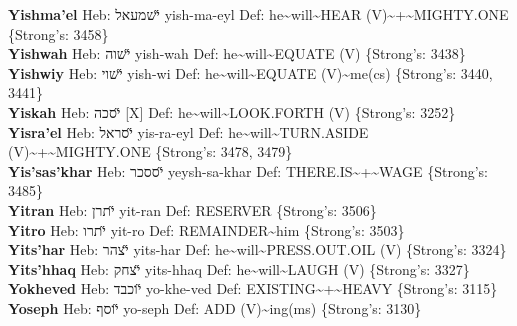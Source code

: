 {\textbf{Yishma'el} Heb: {\large\H ישמעאל} yish-ma-eyl Def: he\textasciitilde{}will\textasciitilde{}HEAR (V)\textasciitilde{}+\textasciitilde{}MIGHTY.ONE \{Strong's: 3458\}\hfill{}\\

\textbf{Yishwah} Heb: {\large\H ישוה} yish-wah Def: he\textasciitilde{}will\textasciitilde{}EQUATE (V) \{Strong's: 3438\}\hfill{}\\

\textbf{Yishwiy} Heb: {\large\H ישוי} yish-wi Def: he\textasciitilde{}will\textasciitilde{}EQUATE (V)\textasciitilde{}me(cs) \{Strong's: 3440, 3441\}\hfill{}\\

\textbf{Yiskah} Heb: {\large\H יסכה} {[}X{]} Def: he\textasciitilde{}will\textasciitilde{}LOOK.FORTH (V) \{Strong's: 3252\}\hfill{}\\

\textbf{Yisra'el} Heb: {\large\H יסראל} yis-ra-eyl Def: he\textasciitilde{}will\textasciitilde{}TURN.ASIDE (V)\textasciitilde{}+\textasciitilde{}MIGHTY.ONE \{Strong's: 3478, 3479\}\hfill{}\\

\textbf{Yis'sas'khar} Heb: {\large\H יססכר} yeysh-sa-khar Def: THERE.IS\textasciitilde{}+\textasciitilde{}WAGE \{Strong's: 3485\}\hfill{}\\

\textbf{Yitran} Heb: {\large\H יתרן} yit-ran Def: RESERVER \{Strong's: 3506\}\hfill{}\\

\textbf{Yitro} Heb: {\large\H יתרו} yit-ro Def: REMAINDER\textasciitilde{}him \{Strong's: 3503\}\hfill{}\\

\textbf{Yits'har} Heb: {\large\H יצהר} yits-har Def: he\textasciitilde{}will\textasciitilde{}PRESS.OUT.OIL (V) \{Strong's: 3324\}\hfill{}\\

\textbf{Yits'hhaq} Heb: {\large\H יצחק} yits-hhaq Def: he\textasciitilde{}will\textasciitilde{}LAUGH (V) \{Strong's: 3327\}\hfill{}\\

\textbf{Yokheved} Heb: {\large\H יוכבד} yo-khe-ved Def: EXISTING\textasciitilde{}+\textasciitilde{}HEAVY \{Strong's: 3115\}\hfill{}\\

\textbf{Yoseph} Heb: {\large\H יוסף} yo-seph Def: ADD (V)\textasciitilde{}ing(ms) \{Strong's: 3130\}\hfill{}\\

}
